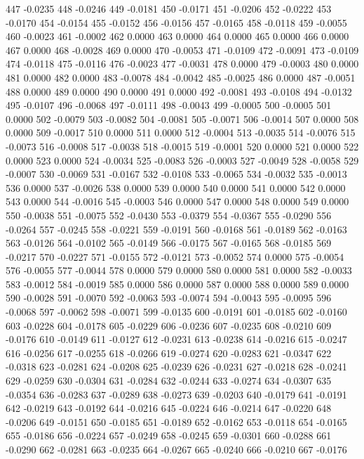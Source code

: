 447 -0.0235
448 -0.0246
449 -0.0181
450 -0.0171
451 -0.0206
452 -0.0222
453 -0.0170
454 -0.0154
455 -0.0152
456 -0.0156
457 -0.0165
458 -0.0118
459 -0.0055
460 -0.0023
461 -0.0002
462 0.0000
463 0.0000
464 0.0000
465 0.0000
466 0.0000
467 0.0000
468 -0.0028
469 0.0000
470 -0.0053
471 -0.0109
472 -0.0091
473 -0.0109
474 -0.0118
475 -0.0116
476 -0.0023
477 -0.0031
478 0.0000
479 -0.0003
480 0.0000
481 0.0000
482 0.0000
483 -0.0078
484 -0.0042
485 -0.0025
486 0.0000
487 -0.0051
488 0.0000
489 0.0000
490 0.0000
491 0.0000
492 -0.0081
493 -0.0108
494 -0.0132
495 -0.0107
496 -0.0068
497 -0.0111
498 -0.0043
499 -0.0005
500 -0.0005
501 0.0000
502 -0.0079
503 -0.0082
504 -0.0081
505 -0.0071
506 -0.0014
507 0.0000
508 0.0000
509 -0.0017
510 0.0000
511 0.0000
512 -0.0004
513 -0.0035
514 -0.0076
515 -0.0073
516 -0.0008
517 -0.0038
518 -0.0015
519 -0.0001
520 0.0000
521 0.0000
522 0.0000
523 0.0000
524 -0.0034
525 -0.0083
526 -0.0003
527 -0.0049
528 -0.0058
529 -0.0007
530 -0.0069
531 -0.0167
532 -0.0108
533 -0.0065
534 -0.0032
535 -0.0013
536 0.0000
537 -0.0026
538 0.0000
539 0.0000
540 0.0000
541 0.0000
542 0.0000
543 0.0000
544 -0.0016
545 -0.0003
546 0.0000
547 0.0000
548 0.0000
549 0.0000
550 -0.0038
551 -0.0075
552 -0.0430
553 -0.0379
554 -0.0367
555 -0.0290
556 -0.0264
557 -0.0245
558 -0.0221
559 -0.0191
560 -0.0168
561 -0.0189
562 -0.0163
563 -0.0126
564 -0.0102
565 -0.0149
566 -0.0175
567 -0.0165
568 -0.0185
569 -0.0217
570 -0.0227
571 -0.0155
572 -0.0121
573 -0.0052
574 0.0000
575 -0.0054
576 -0.0055
577 -0.0044
578 0.0000
579 0.0000
580 0.0000
581 0.0000
582 -0.0033
583 -0.0012
584 -0.0019
585 0.0000
586 0.0000
587 0.0000
588 0.0000
589 0.0000
590 -0.0028
591 -0.0070
592 -0.0063
593 -0.0074
594 -0.0043
595 -0.0095
596 -0.0068
597 -0.0062
598 -0.0071
599 -0.0135
600 -0.0191
601 -0.0185
602 -0.0160
603 -0.0228
604 -0.0178
605 -0.0229
606 -0.0236
607 -0.0235
608 -0.0210
609 -0.0176
610 -0.0149
611 -0.0127
612 -0.0231
613 -0.0238
614 -0.0216
615 -0.0247
616 -0.0256
617 -0.0255
618 -0.0266
619 -0.0274
620 -0.0283
621 -0.0347
622 -0.0318
623 -0.0281
624 -0.0208
625 -0.0239
626 -0.0231
627 -0.0218
628 -0.0241
629 -0.0259
630 -0.0304
631 -0.0284
632 -0.0244
633 -0.0274
634 -0.0307
635 -0.0354
636 -0.0283
637 -0.0289
638 -0.0273
639 -0.0203
640 -0.0179
641 -0.0191
642 -0.0219
643 -0.0192
644 -0.0216
645 -0.0224
646 -0.0214
647 -0.0220
648 -0.0206
649 -0.0151
650 -0.0185
651 -0.0189
652 -0.0162
653 -0.0118
654 -0.0165
655 -0.0186
656 -0.0224
657 -0.0249
658 -0.0245
659 -0.0301
660 -0.0288
661 -0.0290
662 -0.0281
663 -0.0235
664 -0.0267
665 -0.0240
666 -0.0210
667 -0.0176
